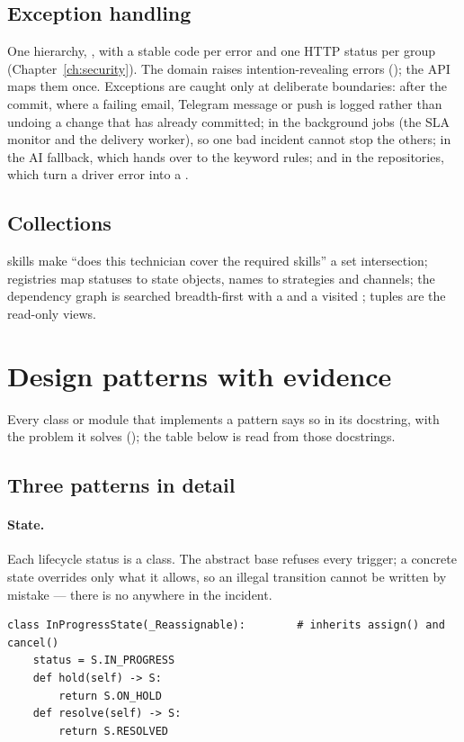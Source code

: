 \subsection*{Exception handling}
One hierarchy, , with a stable code per error and one HTTP status per group
(Chapter~\ref{ch:security}). The domain raises intention-revealing errors
(); the API maps them once. Exceptions are
caught only at deliberate boundaries: after the commit, where a failing email, Telegram message
or push is logged rather than undoing a change that has already committed; in the background
jobs (the SLA monitor and the delivery worker), so one bad incident cannot stop the others; in
the AI fallback, which hands over to the keyword rules; and in the repositories, which turn a
driver error into a .

\subsection*{Collections}
 skills make ``does this technician cover the required skills'' a set
intersection;  registries map statuses to state objects, names to strategies and
channels; the dependency graph is searched breadth-first with a  and a visited
; tuples are the read-only views.

\section{Design patterns with evidence}
Every class or module that implements a pattern says so in its docstring, with the problem it
solves (); the table below is read from those docstrings.



\subsection*{Three patterns in detail}
\paragraph{State.} Each lifecycle status is a class. The abstract base refuses every trigger; a
concrete state overrides only what it allows, so an illegal transition cannot be written by
mistake --- there is no  anywhere in the incident.
\begin{lstlisting}
class InProgressState(_Reassignable):        # inherits assign() and cancel()
    status = S.IN_PROGRESS
    def hold(self) -> S:
        return S.ON_HOLD
    def resolve(self) -> S:
        return S.RESOLVED
\end{lstlisting}

